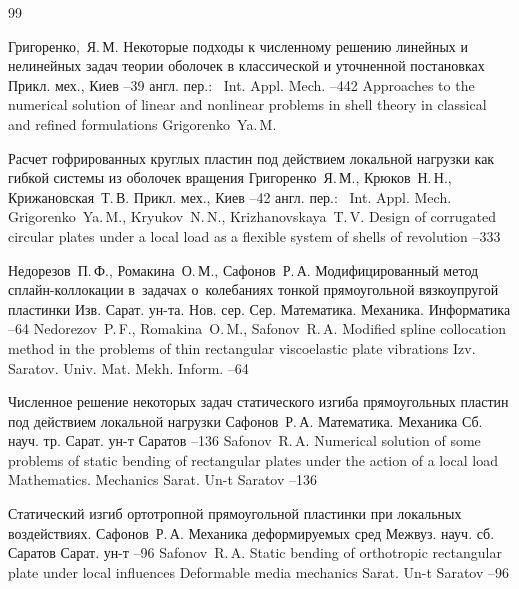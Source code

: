 \vspace{1cm}

\begin{thebibliography}{99}


\by Григоренко,~Я.\,М. 
\paper Некоторые подходы к численному решению линейных и нелинейных задач теории оболочек в классической и уточненной постановках 
\jour Прикл. мех., Киев
--39
\transl англ. пер.:~
\jour Int. Appl. Mech.
--442
\paper Approaches to the numerical solution of linear and nonlinear problems in shell theory in classical and refined formulations
\by Grigorenko~Ya.\,M. 


\paper Расчет гофрированных круглых пластин под действием локальной нагрузки как гибкой системы из оболочек вращения
\by Григоренко~Я.\,М., Крюков~Н.\,Н., Крижановская~Т.\,В.
\jour Прикл. мех., Киев
--42
\transl англ. пер.:~
\jour Int. Appl. Mech.
\by Grigorenko~Ya.\,M., Kryukov~N.\,N., Krizhanovskaya~T.\,V.
\paper Design of corrugated circular plates under a local load as a flexible system of shells of revolution
--333 


\by Недорезов~П.\,Ф., Ромакина~О.\,М., Сафонов~Р.\,А.
\paper Модифицированный метод сплайн-коллокации в~задачах о~колебаниях тонкой прямоугольной вязкоупругой пластинки
\jour Изв. Сарат. ун-та. Нов. сер. Сер. Математика. Механика. Информатика
--64
\misctransl
\by Nedorezov~P.\,F., Romakina~O.\,M., Safonov~R.\,A.
\paper Modified spline collocation method in the problems of thin rectangular viscoelastic plate vibrations
\jour Izv. Saratov. Univ. Mat. Mekh. Inform.
--64


\paper Численное решение некоторых задач статического изгиба прямоугольных пластин под действием локальной нагрузки
\by Сафонов~Р.\,А.
\inbook Математика. Механика
\bookinfo Сб. науч. тр.
\publ Сарат. ун-т
\publaddr Саратов
--136
\misctransl 
\by Safonov~R.\,A.
\paper Numerical solution of some problems of static bending of rectangular plates under the action of a local load
\inbook Mathematics. Mechanics
\publ Sarat. Un-t
\publaddr Saratov
--136


\paper Статический изгиб ортотропной прямоугольной пластинки при локальных воздействиях.
\by Сафонов~Р.\,А.
\inbook Механика деформируемых сред
\bookinfo Межвуз. науч. сб.
\publaddr Саратов
\publ Сарат. ун-т
--96
\misctransl 
\by Safonov~R.\,A.
\paper Static bending of orthotropic rectangular plate under local influences
\inbook Deformable media mechanics
\publ Sarat. Un-t
\publaddr Saratov
--96





\end{thebibliography}
